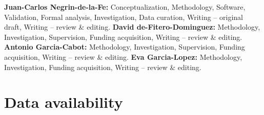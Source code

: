 \documentclass[preprint,12pt, a4paper]{elsarticle}
\begin{document}
\textbf{Juan-Carlos Negrin-de-la-Fe:} Conceptualization, Methodology,
Software, Validation, Formal analysis, Investigation, Data curation, Writing
-- original draft, Writing -- review \& editing.
\textbf{David de-Fitero-Dominguez:} Methodology, Investigation, Supervision,
Funding acquisition, Writing -- review \& editing.
\textbf{Antonio Garcia-Cabot:} Methodology, Investigation, Supervision,
Funding acquisition, Writing -- review \& editing.
\textbf{Eva Garcia-Lopez:} Methodology, Investigation, Funding acquisition,
Writing -- review \& editing.


\section*{Data availability}
\label{sec:dataavailability}
\end{document}
